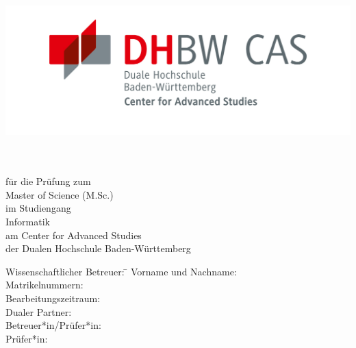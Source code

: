 \begin{titlepage}
    \begin{minipage}{\textwidth}
        \vspace{-1cm}
        \noindent
        \hfill
        \includegraphics{images/dhbw_logo}
    \end{minipage}

    \vspace{0.5cm}

    \begin{center}
        {\textbf{\large{}\TheTitle}} \\[1cm]
        {\Large{\TheTypeOfWork}}\\[6mm]
        für die Prüfung zum \\
        Master of Science (M.Sc.)\\[6mm]

        im Studiengang \\
        Informatik\\[6mm]

        am Center for Advanced Studies\\
        der Dualen Hochschule Baden-Württemberg\\[1.5cm]

        \vfill

        \begin{minipage}{\textwidth}
            \begin{tabbing}
                Wissenschaftlicher Betreuer: \hspace{0.85cm}\=\kill
                Vorname und Nachname: \> \TheAuthor \\[1.5mm]
                Matrikelnummern: \> \TheMatriculationNumber \\[1.5mm]
                Bearbeitungszeitraum: \> \TheProcessingPeriod \\[1.5mm]
                Dualer Partner: \> \TheCompany \\[1.5mm]
                Betreuer*in/Prüfer*in: \> \TheCompanySupervisor \\[1.5mm]
                Prüfer*in: \> \TheScientificSupervisor \\[1.5mm]
            \end{tabbing}
        \end{minipage}
    \end{center}
\end{titlepage}